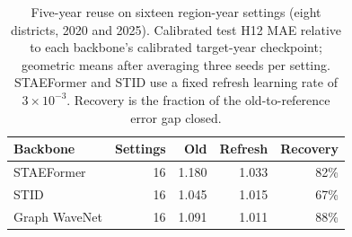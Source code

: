 \begin{table}[t]
\centering
\caption{Five-year reuse on sixteen region-year settings (eight districts, 2020 and 2025). Calibrated test H12 MAE relative to each backbone's calibrated target-year checkpoint; geometric means after averaging three seeds per setting. STAEFormer and STID use a fixed refresh learning rate of $3\times10^{-3}$. Recovery is the fraction of the old-to-reference error gap closed.}
\label{tab:backbones}
\begin{tabular}{lrrrr}
\toprule
Backbone & Settings & Old & Refresh & Recovery \\
\midrule
STAEFormer & 16 & 1.180 & 1.033 & 82\% \\
STID & 16 & 1.045 & 1.015 & 67\% \\
Graph WaveNet & 16 & 1.091 & 1.011 & 88\% \\
\bottomrule
\end{tabular}
\end{table}
